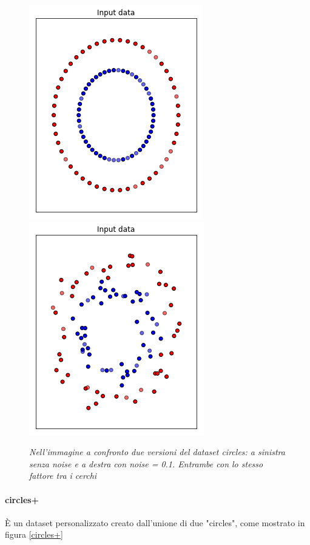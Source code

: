 \documentclass[12pt,a4paper]{report}
\begin{document}
\begin{figure}[H]
 \centering
 \includegraphics[scale = 0.5]{images/circles_nonoise}
 \includegraphics[scale = 0.5]{images/circles_noise}
 \caption{\textit{Nell'immagine a confronto due versioni del dataset circles: a sinistra senza noise e a destra con noise = 0.1. Entrambe con lo stesso fattore tra i cerchi}}
 \label{circles}
\end{figure}

\paragraph{circles+} È un dataset personalizzato creato dall'unione di due "circles", come mostrato in figura \ref{circles+}
\end{document}
